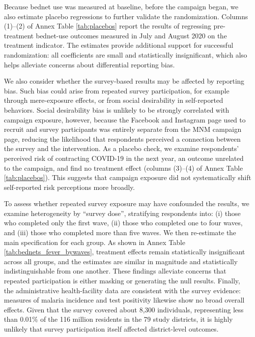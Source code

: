 Because bednet use was measured at baseline, before the campaign began, we also estimate placebo regressions to further validate the randomization. Columns (1)--(2) of Annex Table \ref{tab:placebos} report the results of regressing pre-treatment bednet-use outcomes measured in July and August 2020 on the treatment indicator. The estimates provide additional support for successful randomization: all coefficients are small and statistically insignificant, which also helps alleviate concerns about differential reporting bias.

We also consider whether the survey-based results may be affected by reporting bias. Such bias could arise from repeated survey participation, for example through mere-exposure effects, or from social desirability in self-reported behaviors. Social desirability bias is unlikely to be strongly correlated with campaign exposure, however, because the Facebook and Instagram page used to recruit and survey participants was entirely separate from the MNM campaign page, reducing the likelihood that respondents perceived a connection between the survey and the intervention. As a placebo check, we examine respondents’ perceived risk of contracting COVID-19 in the next year, an outcome unrelated to the campaign, and find no treatment effect (columns (3)--(4) of Annex Table \ref{tab:placebos}). This suggests that campaign exposure did not systematically shift self-reported risk perceptions more broadly.

To assess whether repeated survey exposure may have confounded the results, we examine heterogeneity by ``survey dose'', stratifying respondents into: (i) those who completed only the first wave, (ii) those who completed one to four waves, and (iii) those who completed more than five waves. We then re-estimate the main specification for each group. As shown in Annex Table \ref{tab:bednets_fever_bywaves}, treatment effects remain statistically insignificant across all groups, and the estimates are similar in magnitude and statistically indistinguishable from one another. These findings alleviate concerns that repeated participation is either masking or generating the null results. Finally, the administrative health-facility data are consistent with the survey evidence: measures of malaria incidence and test positivity likewise show no broad overall effects. Given that the survey covered about 8,300 individuals, representing less than 0.01\% of the 116 million residents in the 79 study districts, it is highly unlikely that survey participation itself affected district-level outcomes.

